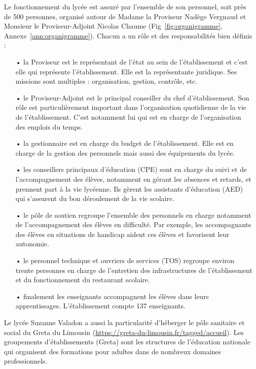 \documentclass[12pt,a4paper]{article}
\begin{document}
Le fonctionnement du lycée est assuré par l'ensemble de son personnel, soit près de 500 personnes, organisé autour de Madame la Proviseur Nadège Vergnaud et Monsieur le Proviseur-Adjoint Nicolas Chaume (Fig~\ref{fig:organigramme}, Annexe~\ref{ann:organigramme}).
Chacun a un rôle et des responsabilités bien définis \cite{Jourdan2016} :
\begin{itemize}
\item[•] la Proviseur est le représentant de l'état au sein de l'établissement et c'est elle qui représente l'établissement.
Elle est la représentante juridique.
Ses missions sont multiples : organisation, gestion, contrôle, etc.
\item[•] le Proviseur-Adjoint est le principal conseiller du chef d'établissement.
Son rôle est particulièrement important dans l'organisation quotidienne de la vie de l'établissement.
C'est notamment lui qui est en charge de l'organisation des emplois du temps.
\item[•] la gestionnaire est en charge du budget de l'établissement.
Elle est en charge de la gestion des personnels mais aussi des équipements du lycée.
\item[•] les conseillers principaux d'éducation (CPE) sont en charge du suivi et de l'accompagnement des élèves, notamment en gérant les absences et retards, et prennent part à la vie lycéenne.
Ils gèrent les assistants d'éducation (AED) qui s'assurent du bon déroulement de la vie scolaire.
\item[•] le pôle de soutien regroupe l'ensemble des personnels en charge notamment de l'accompagnement des élèves en difficulté.
Par exemple, les accompagnants des élèves en situations de handicap aident ces élèves et favorisent leur autonomie.
\item[•] le personnel technique et ouvriers de services (TOS) regroupe environ trente personnes en charge de l'entretien des infrastructures de l'établissement et du fonctionnement du restaurant scolaire.
\item[•] finalement les enseignants accompagnent les élèves dans leurs apprentissages.
L'établissement compte 137 enseignants.
\end{itemize}

Le lycée Suzanne Valadon a aussi la particularité d'héberger le pôle sanitaire et social du Greta du Limousin (\href{https://greta-du-limousin.fr/tagged/accueil}{https://greta-du-limousin.fr/tagged/accueil}).
Les groupements d'établissements (Greta) sont les structures de l'éducation nationale qui organisent des formations pour adultes dans de nombreux domaines professionnels. 
\end{document}
